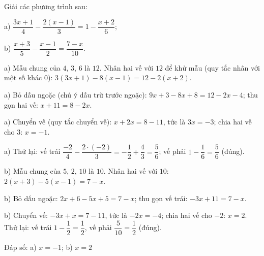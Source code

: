 \begin{problem}[8DS-PT1-040]
Giải các phương trình sau:

a) $\dfrac{3x + 1}{4} - \dfrac{2(x - 1)}{3} = 1 - \dfrac{x + 2}{6}$;

b) $\dfrac{x + 3}{5} - \dfrac{x - 1}{2} = \dfrac{7 - x}{10}$.

\begin{solution}
a) Mẫu chung của $4$, $3$, $6$ là $12$. Nhân hai vế với $12$ để khử mẫu (quy tắc nhân với một số khác $0$): $3(3x + 1) - 8(x - 1) = 12 - 2(x + 2)$.

a) Bỏ dấu ngoặc (chú ý dấu trừ trước ngoặc): $9x + 3 - 8x + 8 = 12 - 2x - 4$; thu gọn hai vế: $x + 11 = 8 - 2x$.

a) Chuyển vế (quy tắc chuyển vế): $x + 2x = 8 - 11$, tức là $3x = -3$; chia hai vế cho $3$: $x = -1$.

a) Thử lại: vế trái $\dfrac{-2}{4} - \dfrac{2 \cdot (-2)}{3} = -\dfrac{1}{2} + \dfrac{4}{3} = \dfrac{5}{6}$; vế phải $1 - \dfrac{1}{6} = \dfrac{5}{6}$ (đúng).

b) Mẫu chung của $5$, $2$, $10$ là $10$. Nhân hai vế với $10$: $2(x + 3) - 5(x - 1) = 7 - x$.

b) Bỏ dấu ngoặc: $2x + 6 - 5x + 5 = 7 - x$; thu gọn vế trái: $-3x + 11 = 7 - x$.

b) Chuyển vế: $-3x + x = 7 - 11$, tức là $-2x = -4$; chia hai vế cho $-2$: $x = 2$. Thử lại: vế trái $1 - \dfrac{1}{2} = \dfrac{1}{2}$, vế phải $\dfrac{5}{10} = \dfrac{1}{2}$ (đúng).

Đáp số: a) $\boxed{x = -1}$; b) $\boxed{x = 2}$
\end{solution}
\end{problem}

